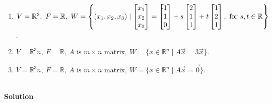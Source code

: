 \documentclass[11pt]{article}
\begin{document}
\begin{enumerate}[label=(\Alph*)]
    \item $V = \mathbb{R}^3, \ F = \mathbb{R}, \ W=\left\{\left(x_1, x_2, x_3\right) \mid 
    \begin{bmatrix}
x_1 \\ x_2 \\ x_3
\end{bmatrix} = 
\begin{bmatrix}
\llap{-}1 \\ 1 \\ 0
\end{bmatrix} + 
s \begin{bmatrix}
2 \\ 1 \\ 1
\end{bmatrix}
+ t
\begin{bmatrix}
1 \\ 2 \\ 1
\end{bmatrix}, \text{ for }s,t \in \mathbb{R}
    \right\}$.
    
    \item $V = \mathbb{R}^3n, \ F = \mathbb{R}, \ A \text{ is }m \times n \text{ matrix}, \ W=\{ x \in \mathbb{R}^n \mid A\vec{x} = 3\vec{x} \}$.
    \item $V = \mathbb{R}^3n, \ F = \mathbb{R}, \ A \text{ is }m \times n \text{ matrix}, \ W=\{ x \in \mathbb{R}^n \mid A\vec{x} = \vec{0} \}$.
\end{enumerate}
\bigskip\\
\textbf{Solution}\\
\end{document}
